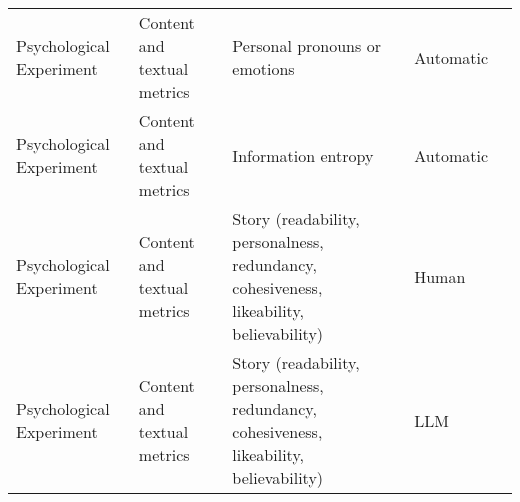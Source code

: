 \begin{small}
\begin{center}
\begin{longtable}{@{}p{}p{}p{}p{}p{}@{}}
Psychological Experiment & Content and textual metrics         & Personal pronouns or emotions                                                                                                                                                                               & Automatic & \cite{de2025introducing}                                                                                                                                                                                                                                                                                                           \\
Psychological Experiment & Content and textual metrics         & Information entropy                                                                                                                                                                                         & Automatic & \cite{Wang2023UserBS}                                                                                                                                                                                                                                                                                                                                                                                            \\
Psychological Experiment & Content and textual metrics         & Story (readability, personalness, redundancy, cohesiveness, likeability, believability)                                                                                                                     & Human     & \cite{Jiang2023PersonaLLMIT}                                                                                                                                                                                                                                                                                                                                                                              \\
Psychological Experiment & Content and textual metrics         & Story (readability, personalness, redundancy, cohesiveness, likeability, believability)                                                                                                                     & LLM       & \cite{Jiang2023PersonaLLMIT}                                                                                                                                                                                                                                                                                                                                                                              \\

\end{longtable}
\end{center}
\end{small}
